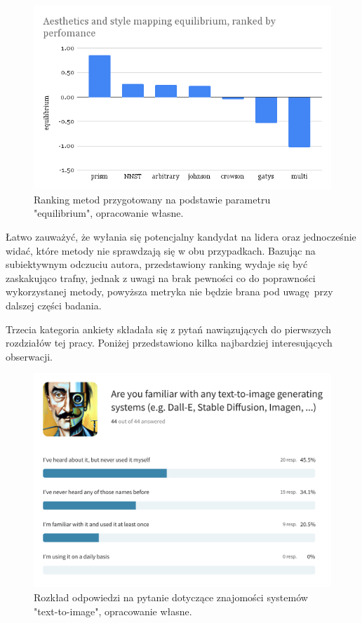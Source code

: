 \documentclass[12pt]{article}
\begin{document}
\begin{figure}[H]
    \centering
    \includegraphics[scale=0.55]{p6}
    \caption{Ranking metod przygotowany na podstawie parametru "equilibrium", opracowanie własne.}
    \label{fig:23}
\end{figure}

Łatwo zauważyć, że wyłania się potencjalny kandydat na lidera oraz jednocześnie widać, które metody nie sprawdzają się w obu przypadkach. Bazując na subiektywnym odczuciu autora, przedstawiony ranking wydaje się być zaskakująco trafny, jednak z uwagi na brak pewności co do poprawności wykorzystanej metody, powyższa metryka nie będzie brana pod uwagę przy dalszej części badania.

Trzecia kategoria ankiety składała się z pytań nawiązujących do pierwszych rozdziałów tej pracy. Poniżej przedstawiono kilka najbardziej interesujących obserwacji.
\begin{figure}[H]
    \centering
    \includegraphics[scale=0.21]{p7}
    \caption{Rozkład odpowiedzi na pytanie dotyczące znajomości systemów "text-to-image", opracowanie własne.}
    \label{fig:24}
\end{figure}
\end{document}
